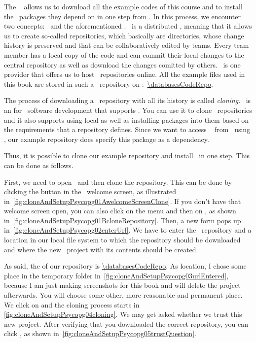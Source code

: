 %
The \pycharm\  allows us to download all the example codes of this course and to install the \python\ packages they depend on in one step from \github.
In this process, we encounter two concepts: \git\ and the aforementioned .
\git\ is a distributed , meaning that it allows us to create so-called repositories, which basically are directories, whose change history is preserved and that can be collaboratively edited by teams.
Every team member has a local copy of the code and can commit their local changes to the central repository as well as download the changes comitted by others.
\github\ is one provider that offers us to host \git\ repositories online.
All the example files used in this book are stored in such a \git\ repository on \github:~\expandafter\url{\databasesCodeRepo}.

The process of downloading a \git\ repository with all its history is called \emph{cloning}.
\pycharm\ is an  for \python\ software development that supports \git.
You can use it to clone \git\ repositories and it also supports using local  as well as installing packages into them based on the requirements that a repository defines.
Since we want to access \postgresql\  from \python\ using \psycopg, our example repository does specify this package as a dependency.

Thus, it is possible to clone our example repository and install \psycopg\ in one step.
This can be done as follows.

First, we need to open \pycharm\ and then clone the repository.
This can be done by clicking the  button in the \pycharm\ welcome screen, as illustrated in~\cref{fig:cloneAndSetupPsycopg01AwelcomeScreenClone}.
If you don't have that welcome screen open, you can also click on the  menu and then on , as shown in~\cref{fig:cloneAndSetupPsycopg01BcloneRepository}.
Then, a new form pops up in~\cref{fig:cloneAndSetupPsycopg02enterUrl}.
We have to enter the \git\ repository  and a location in our local file system to which the repository should be downloaded and where the new \pycharm\ project with its contents should be created.

As said, the  of our repository is \expandafter\url{\databasesCodeRepo}.
As location, I chose some place in the temporary folder in~\cref{fig:cloneAndSetupPsycopg03urlEntered}, because I am just making screenshots for this book and will delete the project afterwards.
You will choose some other, more reasonable and permanent place.
We click on  and the cloning process starts in \cref{fig:cloneAndSetupPsycopg04cloning}.
We may get asked whether we trust this new project.
After verifying that you downloaded the correct repository, you can click , as shown in~\cref{fig:cloneAndSetupPsycopg05trustQuestion}.

